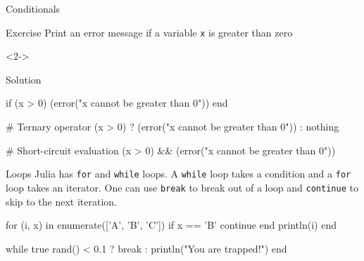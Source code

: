 \documentclass{beamer}
\newenvironment{Boxx}{\begin{tcolorbox}[standard jigsaw, opacityframe=0.8, opacityback=0.0]}{\end{tcolorbox}}
\begin{document}
\begin{frame}[fragile]{Conditionals}
	\begin{overlayarea}{\linewidth}{7cm}
	\begin{block}{Exercise}
	Print an error message if a variable \verb|x| is greater than zero
	\end{block}
	\vfill
	\begin{onlyenv}<2->
	\begin{block}{Solution}
		\vspace*{1mm}
		\begin{jllisting}[mathescape]
  if (x > 0) (error("x cannot be greater than 0")) end
	
  # Ternary operator		
  (x > 0) ? (error("x cannot be greater than 0")) : nothing
			
  # Short-circuit evaluation
  (x > 0) && (error("x cannot be greater than 0"))
		\end{jllisting}
	\vspace*{1mm}
	\end{block}
\end{onlyenv}
\end{overlayarea}
\end{frame}

\begin{frame}[fragile]{Loops}
  Julia has \verb|for| and \verb|while| loops. A \verb|while| loop takes a condition and a \verb|for| loop takes an iterator.
  One can use \verb|break| to break out of a loop and \verb|continue| to skip to the next iteration. %
  	\vspace*{3mm}
  \begin{Boxx}
  \begin{jllisting}
  for (i, x) in enumerate(['A', 'B', 'C'])
    if x == 'B'
      continue
    end
    println(i)
  end

  while true
    rand() < 0.1 ? break : println("You are trapped!")
  end
  \end{jllisting}
\end{Boxx}
\end{frame}
\end{document}
